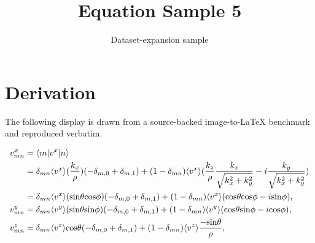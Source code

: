 \documentclass[11pt]{article}
\title{Equation Sample 5}
\author{Dataset-expansion sample}
\date{}
\begin{document}
\maketitle
\section{Derivation}
The following display is drawn from a source-backed image-to-LaTeX benchmark and reproduced verbatim.

\begin{equation*}
\begin{aligned}
v_{mn}^{x}
&=\langle m|v^{x}|n\rangle\\
&=\delta_{mn}\langle v^{x}\rangle (\frac{k_{x}}{\rho})(-\delta_{m,0}+\delta_{m,1})
+(1-\delta_{mn})\langle v^{x}\rangle (\frac{k_{z}}{\rho}\frac{k_{x}}{\sqrt{k_{x}^{2}+k_{y}^{2}}}-i\frac{k_{y}}{\sqrt{k_{x}^{2}+k_{y}^{2}}})\\
&=\delta_{mn}\langle v^{x}\rangle ({\rm sin}\theta{\rm cos}\phi)(-\delta_{m,0}+\delta_{m,1})
+(1-\delta_{mn})\langle v^{x}\rangle ({\rm cos}\theta{\rm cos}\phi-i{\rm sin}\phi),\\
v_{mn}^{y}
&=\delta_{mn}\langle v^{y}\rangle ({\rm sin}\theta{\rm sin}\phi)(-\delta_{m,0}+\delta_{m,1})
+(1-\delta_{mn})\langle v^{y}\rangle ({\rm cos}\theta{\rm sin}\phi-i{\rm cos}\phi),\\
v_{mn}^{z}
&=\delta_{mn}\langle v^{z}\rangle {\rm cos}\theta(-\delta_{m,0}+\delta_{m,1})
+(1-\delta_{mn})\langle v^{z}\rangle \frac{-{\rm sin}\theta}{\rho},\\
\end{aligned}
\end{equation*}
\end{document}

